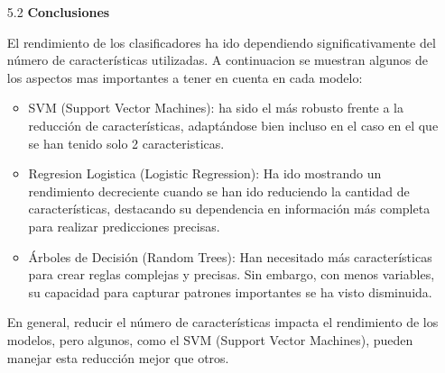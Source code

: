 \documentclass{article}
\begin{document}
\begin{itemize}

\item[5.2]  {\bf Conclusiones}

El rendimiento de los clasificadores ha ido dependiendo significativamente del número de características utilizadas. A continuacion se muestran algunos de los aspectos mas importantes a tener en cuenta en cada modelo:

\begin{itemize}

\item
SVM (Support Vector Machines): ha sido el más robusto frente a la reducción de características, adaptándose bien incluso en el caso en el que se han tenido solo 2 caracteristicas.

\item
Regresion Logistica (Logistic Regression): Ha ido mostrando un rendimiento decreciente cuando se han ido reduciendo la cantidad de características, destacando su dependencia en información más completa para realizar predicciones precisas.

\item
Árboles de Decisión (Random Trees): Han necesitado más características para crear reglas complejas y precisas. Sin embargo, con menos variables, su capacidad para capturar patrones importantes se ha visto disminuida.

\end{itemize}

En general, reducir el número de características impacta el rendimiento de los modelos, pero algunos, como el SVM (Support Vector Machines), pueden manejar esta reducción mejor que otros.

\end{itemize}
\end{document}
